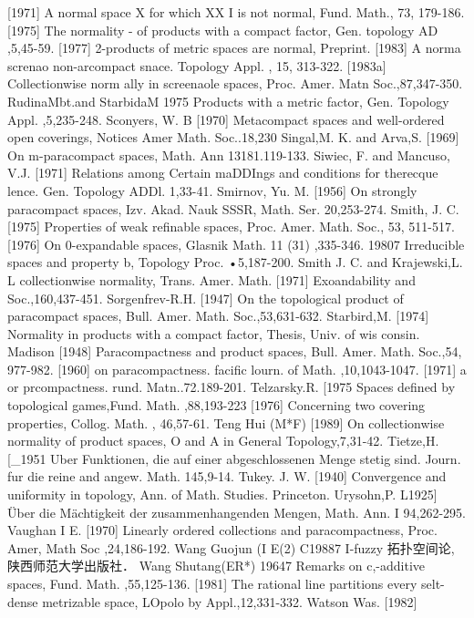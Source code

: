\documentclass[main.tex]{subfiles}
\begin{document}
{	[1971]
	A normal space X for which XX I is not normal, Fund. Math., 73,
	179-186.
	[1975] The normality
	- of products with a compact
	factor, Gen. topology AD
	,5,45-59.
	[1977]
	2-products of metric spaces are normal, Preprint.
[1983]
A norma screnao non-arcompact
snace. Topology
Appl. , 15,
313-322.
[1983a]
Collectionwise
norm
ally in screenaole spaces, Proc. Amer. Matn
Soc.,87,347-350.
RudinaMbt.and StarbidaM
1975 Products with a metric factor, Gen. Topology Appl. ,5,235-248.
Sconyers, W. B
[1970]
Metacompact spaces and well-ordered open coverings, Notices Amer
Math. Soc..18,230
Singal,M. K. and Arva,S.
[1969]
On m-paracompact spaces, Math. Ann
13181.119-133.
Siwiec, F. and Mancuso, V.J.
[1971]
Relations among
Certain maDDIngs and
conditions for therecque
lence. Gen. Topology ADDl. 1,33-41.
Smirnov, Yu. M.
[1956]
On strongly paracompact spaces, Izv. Akad. Nauk SSSR, Math. Ser.
20,253-274.
Smith, J. C.
[1975] Properties of weak refinable spaces, Proc. Amer. Math. Soc., 53,
511-517.
[1976] On 0-expandable spaces, Glasnik Math. 11 (31) ,335-346.
19807 Irreducible spaces and property b, Topology Proc.
•5,187-200.
Smith J. C. and Krajewski,L. L
collectionwise normality, Trans. Amer. Math.
[1971]
Exoandability and
Soc.,160,437-451.
Sorgenfrev-R.H.
[1947]
On the topological product of paracompact spaces, Bull. Amer. Math.
Soc.,53,631-632.
Starbird,M.
[1974]
Normality in products with a compact factor, Thesis, Univ. of wis
consin. Madison
[1948]
Paracompactness and product spaces, Bull. Amer. Math. Soc.,54,
977-982.
[1960]
on paracompactness. facific lourn.
of Math. ,10,1043-1047.
[1971]
a or prcompactness. rund. Matn..72.189-201.
Telzarsky.R.
[1975 Spaces defined by topological games,Fund. Math. ,88,193-223
[1976]
Concerning two covering properties, Collog. Math. , 46,57-61.
Teng Hui (M*F)
[1989]
On collectionwise normality of product spaces, O and A in General
Topology,7,31-42.
Tietze,H.
[_1951 Uber Funktionen, die auf einer abgeschlossenen Menge stetig sind.
Journ. fur die reine and angew. Math. 145,9-14.
Tukey. J. W.
[1940]
Convergence and uniformity in topology, Ann. of Math. Studies.
Princeton.
Urysohn,P.
L1925] Über die Mächtigkeit der zusammenhangenden Mengen, Math. Ann. I
94,262-295.
Vaughan I E.
[1970] Linearly ordered collections and paracompactness, Proc. Amer, Math
Soc
,24,186-192.
Wang Guojun (I E(2)
	C19887 I-fuzzy 拓扑空间论,陕西师范大学出版社．
	Wang Shutang(ER*)
	19647 Remarks on c,-additive spaces, Fund. Math. ,55,125-136.
	[1981]
	The rational line partitions every selt-dense metrizable space, LOpolo
	by
	Appl.,12,331-332.
	Watson Was.
	[1982]
}
\end{document}

